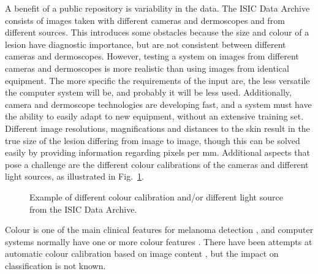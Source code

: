 \documentclass[a4paper,12pt]{article}
\begin{document}

A benefit of a public repository is variability in the data. 
The ISIC Data Archive consists of images taken with different cameras and dermoscopes and from different sources. 
This introduces some obstacles because the size and colour of a lesion have diagnostic importance, but are not consistent between different cameras and dermoscopes. 
However, testing a system on images from different cameras and dermoscopes is more realistic than using images from identical equipment. 
The more specific the requirements of the input are, the less versatile the computer system will be, and probably it will be less used. 
Additionally, camera and dermoscope technologies are developing fast, and a system must have the ability to easily adapt to new equipment, without an extensive training set. 
Different image resolutions, magnifications and distances to the skin result in the true size of the lesion differing from image to image, though this can be solved easily by providing information regarding pixels per mm. 
Additional aspects that pose a challenge are the different colour calibrations of the cameras and different light sources, as illustrated in Fig.~\ref{fig:Colour}. 
  \begin{figure}[h!]
  \centering
        \caption{Example of different colour calibration and/or different light source from the ISIC Data Archive.}
        \label{fig:Colour}
   \end{figure}
Colour is one of the main clinical features for melanoma detection \citep{Argenziano2003Dermoscopy}, and computer systems normally have one or more colour features \citep{Korotkov2012Computerized}. 
There have been attempts at automatic colour calibration based on image content \citep{Iyatomi2011Automated}, but the impact on classification is not known. 
\end{document}
